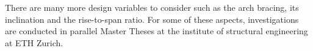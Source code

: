 There are many more design variables to consider such as the arch bracing, its inclination and the rise-to-span ratio. For some of these aspects, investigations are conducted in parallel Master Theses at the institute of structural engineering at ETH Zurich.

